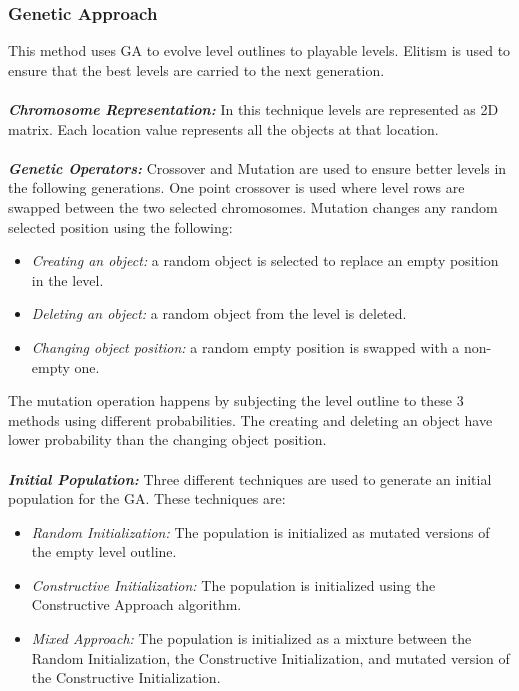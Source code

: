 \documentclass[letterpaper]{article}
\begin{document}
\subsubsection{Genetic Approach}
This method uses GA to evolve level outlines to playable levels. Elitism is used to ensure that the best levels are carried to the next generation.\\\\
\emph{\textbf{Chromosome Representation:}} In this technique levels are represented as 2D matrix. Each location value represents all the objects at that location.\\\\
\emph{\textbf{Genetic Operators:}} Crossover and Mutation are used to ensure better levels in the following generations. One point crossover is used where level rows are swapped between the two selected chromosomes. Mutation changes any random selected position using the following:
\begin{itemize}
	\item \emph{Creating an object:} a random object is selected to replace an empty position in the level.
	\item \emph{Deleting an object:} a random object from the level is deleted.
	\item \emph{Changing object position:} a random empty position is swapped with a non-empty one.
\end{itemize}
The mutation operation happens by subjecting the level outline to these 3 methods using different probabilities. The creating and deleting an object have lower probability than the changing object position.\\\\
\emph{\textbf{Initial Population:}} Three different techniques are used to generate an initial population for the GA. These techniques are:
\begin{itemize}
	\item \emph{Random Initialization:} The population is initialized as mutated versions of the empty level outline.
	\item \emph{Constructive Initialization:} The population is initialized using the Constructive Approach algorithm.
	\item \emph{Mixed Approach:} The population is initialized as a mixture between the Random Initialization, the Constructive Initialization, and mutated version of the Constructive Initialization.
\end{itemize}
\end{document}
